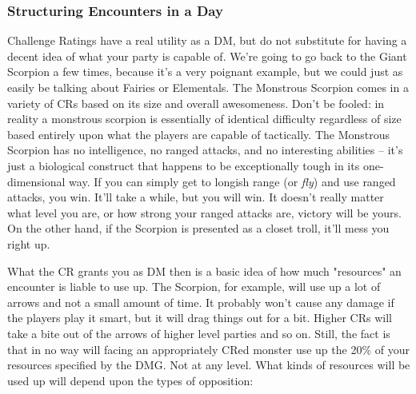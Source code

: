 \subsubsection{Structuring Encounters in a Day}

Challenge Ratings have a real utility as a DM, but do not substitute for having a decent idea of what your party is capable of. We're going to go back to the Giant Scorpion a few times, because it's a very poignant example, but we could just as easily be talking about Fairies or Elementals. The Monstrous Scorpion comes in a variety of CRs based on its size and overall awesomeness. Don't be fooled: in reality a monstrous scorpion is essentially of identical difficulty regardless of size based entirely upon what the players are capable of tactically. The Monstrous Scorpion has no intelligence, no ranged attacks, and no interesting abilities -- it's just a biological construct that happens to be exceptionally tough in its one-dimensional way. If you can simply get to longish range (or \textit{fly}) and use ranged attacks, you win. It'll take a while, but you will win. It doesn't really matter what level you are, or how strong your ranged attacks are, victory will be yours. On the other hand, if the Scorpion is presented as a closet troll, it'll mess you right up.

What the CR grants you as DM then is a basic idea of how much "resources" an encounter is liable to use up. The Scorpion, for example, will use up a lot of arrows and not a small amount of time. It probably won't cause any damage if the players play it smart, but it will drag things out for a bit. Higher CRs will take a bite out of the arrows of higher level parties and so on. Still, the fact is that in no way will facing an appropriately CRed monster use up the 20\% of your resources specified by the DMG. Not at any level. What kinds of resources will be used up will depend upon the types of opposition:

